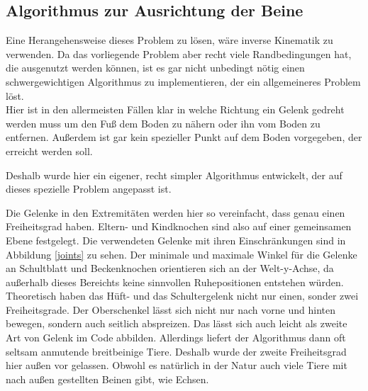 \subsection{Algorithmus zur Ausrichtung der Beine}
\label{leg_algo}

Eine Herangehensweise dieses Problem zu lösen, wäre inverse Kinematik zu verwenden. 
Da das vorliegende Problem aber recht viele Randbedingungen hat, die ausgenutzt werden können, ist es gar nicht unbedingt nötig einen schwergewichtigen Algorithmus zu implementieren, der ein allgemeineres Problem löst.\\
Hier ist \zb in den allermeisten Fällen klar in welche Richtung ein Gelenk gedreht werden muss um den Fuß dem Boden zu nähern oder ihn vom Boden zu entfernen. Außerdem ist gar kein spezieller Punkt auf dem Boden vorgegeben, der erreicht werden soll.

Deshalb wurde hier ein eigener, recht simpler Algorithmus entwickelt, der auf dieses spezielle Problem angepasst ist.

Die Gelenke in den Extremitäten werden hier so vereinfacht, dass genau einen Freiheitsgrad haben. Eltern- und Kindknochen sind also auf einer gemeinsamen Ebene festgelegt. Die verwendeten Gelenke mit ihren Einschränkungen sind in Abbildung \ref{joints} zu sehen. Der minimale und maximale Winkel für die Gelenke an Schultblatt und Beckenknochen orientieren sich an der Welt-y-Achse, da außerhalb dieses Bereichts keine sinnvollen Ruhepositionen entstehen würden. \\
Theoretisch haben das Hüft- und das Schultergelenk nicht nur einen, sonder zwei Freiheitsgrade. Der Oberschenkel lässt sich nicht nur nach vorne und hinten bewegen, sondern auch seitlich abspreizen. Das lässt sich auch leicht als zweite Art von Gelenk im Code abbilden. Allerdings liefert der Algorithmus dann oft seltsam anmutende breitbeinige Tiere.
Deshalb wurde der zweite Freiheitsgrad hier außen vor gelassen.
Obwohl es natürlich in der Natur auch viele Tiere mit nach außen gestellten Beinen gibt, wie \zb Echsen.


